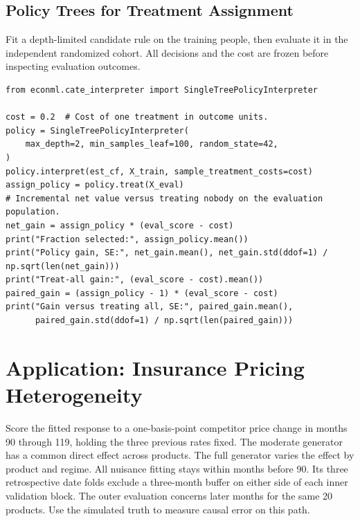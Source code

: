 \subsection{Policy Trees for Treatment Assignment}

Fit a depth-limited candidate rule on the training people, then evaluate it in the independent randomized cohort. All decisions and the cost are frozen before inspecting evaluation outcomes.

\begin{verbatim}
from econml.cate_interpreter import SingleTreePolicyInterpreter

cost = 0.2  # Cost of one treatment in outcome units.
policy = SingleTreePolicyInterpreter(
    max_depth=2, min_samples_leaf=100, random_state=42,
)
policy.interpret(est_cf, X_train, sample_treatment_costs=cost)
assign_policy = policy.treat(X_eval)
# Incremental net value versus treating nobody on the evaluation population.
net_gain = assign_policy * (eval_score - cost)
print("Fraction selected:", assign_policy.mean())
print("Policy gain, SE:", net_gain.mean(), net_gain.std(ddof=1) / np.sqrt(len(net_gain)))
print("Treat-all gain:", (eval_score - cost).mean())
paired_gain = (assign_policy - 1) * (eval_score - cost)
print("Gain versus treating all, SE:", paired_gain.mean(),
      paired_gain.std(ddof=1) / np.sqrt(len(paired_gain)))
\end{verbatim}



\section{Application: Insurance Pricing Heterogeneity}\label{sec:ch09_application}

Score the fitted response to a one-basis-point competitor price change in months 90 through 119, holding the three previous rates fixed. The moderate generator has a common direct effect across products. The full generator varies the effect by product and regime. All nuisance fitting stays within months before 90. Its three retrospective date folds exclude a three-month buffer on either side of each inner validation block. The outer evaluation concerns later months for the same 20 products. Use the simulated truth to measure causal error on this path.

